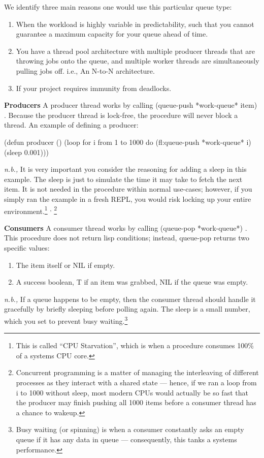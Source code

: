 \documentclass[12pt, letterpaper]{article}
\DeclareRobustCommand{\code}[1]{%
	\begingroup
	\setlength{\fboxsep}{2pt}%
	\colorbox{gray!15}{\ttfamily\small #1}%
	\endgroup
}
\newcommand{\supcom}{%
	\textsuperscript{,}
}
\begin{document}
	We identify three main reasons one would use this particular queue type:
	\begin{enumerate}
		\item When the workload is highly variable in predictability, such that you cannot guarantee a maximum capacity for your queue ahead of time.
		\item You have a thread pool architecture with multiple producer threads that are throwing jobs onto the queue, and multiple worker threads are simultaneously pulling jobs off. i.e., An N-to-N architecture.
		\item If your project requires immunity from deadlocks.
	\end{enumerate}
	\textbf{Producers}
	A producer thread works by calling \code{(queue-push *work-queue* item)}. Because the producer thread is lock-free, the procedure will never block a thread. An example of defining a producer:
\begin{lispcode}
(defun producer ()
(loop for i from 1 to 1000 do
(fl:queue-push *work-queue* i)
(sleep 0.001)))
\end{lispcode}
	\textit{n.b.,} It is very important you consider the reasoning for adding a sleep in this example. The sleep is just to simulate the time it may take to fetch the next item. It is not needed in the procedure within normal use-cases; however, if you simply ran the example in a fresh REPL, you would risk locking up your entire environment.\footnote{This is called ``CPU Starvation'', which is when a procedure consumes 100\% of a systems CPU core.}\supcom\footnote{Concurrent programming is a matter of managing the interleaving of different processes as they interact with a shared state --- hence, if we ran a loop from i to 1000 without sleep, most modern CPUs would actually be so fast that the producer may finish pushing all 1000 items before a consumer thread has a chance to wakeup.}
	
	\textbf{Consumers}
	A consumer thread works by calling \code{(queue-pop *work-queue*)}. This procedure does not return lisp conditions; instead, \code{queue-pop} returns two specific values:
	\begin{enumerate}
		\item The \code{item} itself or \code{NIL} if empty.
		\item A \code{success} boolean, \code{T} if an item was grabbed, \code{NIL} if the queue was empty.
	\end{enumerate}
	\textit{n.b.,} If a queue happens to be empty, then the consumer thread should handle it gracefully by briefly sleeping before polling again. The sleep is a small number, which you set to prevent busy waiting.\footnote{Busy waiting (or spinning) is when a consumer constantly asks an empty queue if it has any data in queue --- consequently, this tanks a systems performance.}
	
\end{document}
